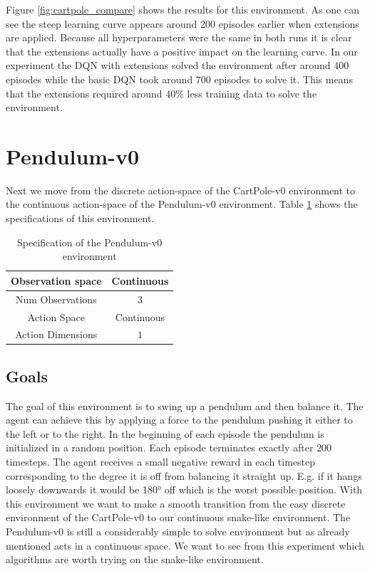 Figure \ref{fig:cartpole_compare} shows the results for this environment.
As one can see the steep learning curve appears around 200 episodes earlier when extensions are applied.
Because all hyperparameters were the same in both runs it is clear that the extensions actually have a positive impact on the learning curve.
In our experiment the DQN with extensions solved the environment after around 400 episodes while the basic DQN took around 700 episodes to solve it.
This means that the extensions required around 40\% less training data to solve the environment.


\section{Pendulum-v0}

Next we move from the discrete action-space of the CartPole-v0 environment to the continuous
action-space of the Pendulum-v0 environment.
Table \ref{tb:pendulum_specs} shows the specifications of this environment.

\begin{table}[H]
  \centering
  \begin{tabular}{| c | c |}
      \hline
      Observation space & Continuous\\
      \hline
      Num Observations & $3$\\
      \hline
      Action Space & Continuous\\
      \hline
      Action Dimensions & $1$\\
      \hline
  \end{tabular}
\caption{Specification of the Pendulum-v0 environment}
\label{tb:pendulum_specs}
\end{table}

\subsection{Goals}

The goal of this environment is to swing up a pendulum and then balance it.
The agent can achieve this by applying a force to the pendulum pushing it either to the left or to the right.
In the beginning of each episode the pendulum is initialized in a random position.
Each episode terminates exactly after $200$ timesteps.
The agent receives a small negative reward in each timestep corresponding to the degree it is off from balancing it straight up.
E.g. if it hangs loosely downwards it would be 180° off which is the worst possible position.
With this environment we want to make a smooth transition from the easy discrete environment of the CartPole-v0 to our continuous snake-like environment.
The Pendulum-v0 is still a considerably simple to solve environment but as already mentioned acts in a continuous space.
We want to see from this experiment which algorithms are worth trying on the snake-like environment.

